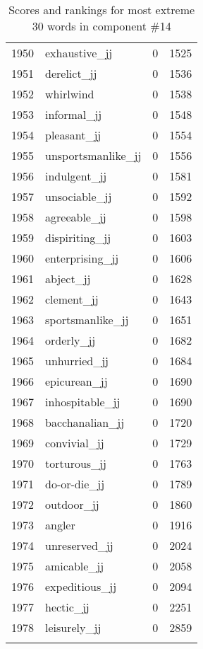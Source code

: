 \begin{longtable}[!htbp]{| rlr@{.}l |}
    1950 & exhaustive\_jj & 0 & 1525 \\
    1951 & derelict\_jj & 0 & 1536 \\
    1952 & whirlwind & 0 & 1538 \\
    1953 & informal\_jj & 0 & 1548 \\
    1954 & pleasant\_jj & 0 & 1554 \\
    1955 & unsportsmanlike\_jj & 0 & 1556 \\
    1956 & indulgent\_jj & 0 & 1581 \\
    1957 & unsociable\_jj & 0 & 1592 \\
    1958 & agreeable\_jj & 0 & 1598 \\
    1959 & dispiriting\_jj & 0 & 1603 \\
    1960 & enterprising\_jj & 0 & 1606 \\
    1961 & abject\_jj & 0 & 1628 \\
    1962 & clement\_jj & 0 & 1643 \\
    1963 & sportsmanlike\_jj & 0 & 1651 \\
    1964 & orderly\_jj & 0 & 1682 \\
    1965 & unhurried\_jj & 0 & 1684 \\
    1966 & epicurean\_jj & 0 & 1690 \\
    1967 & inhospitable\_jj & 0 & 1690 \\
    1968 & bacchanalian\_jj & 0 & 1720 \\
    1969 & convivial\_jj & 0 & 1729 \\
    1970 & torturous\_jj & 0 & 1763 \\
    1971 & do-or-die\_jj & 0 & 1789 \\
    1972 & outdoor\_jj & 0 & 1860 \\
    1973 & angler & 0 & 1916 \\
    1974 & unreserved\_jj & 0 & 2024 \\
    1975 & amicable\_jj & 0 & 2058 \\
    1976 & expeditious\_jj & 0 & 2094 \\
    1977 & hectic\_jj & 0 & 2251 \\
    1978 & leisurely\_jj & 0 & 2859 \\
    \hline
    \caption{Scores and rankings for most extreme 30 words in component \#14} \\
\end{longtable}
